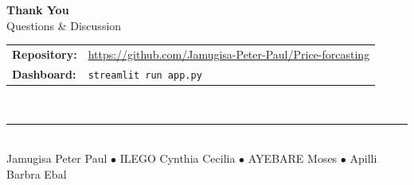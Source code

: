 \documentclass[aspectratio=169,11pt]{beamer}
\begin{document}
\begin{frame}{}
\centering
\vspace{1.5cm}
{\Huge\textbf{Thank You}}\\[0.8em]
{\Large Questions \& Discussion}\\[1.5em]
\begin{tabular}{ll}
\textbf{Repository:} & \url{https://github.com/Jamugisa-Peter-Paul/Price-forcasting} \\
\textbf{Dashboard:} & \texttt{streamlit run app.py} \\
\end{tabular}\\[1.5em]
\rule{8cm}{0.5pt}\\[0.5em]
\small Jamugisa Peter Paul $\bullet$ ILEGO Cynthia Cecilia $\bullet$ AYEBARE Moses $\bullet$ Apilli Barbra Ebal
\end{frame}
\end{document}
